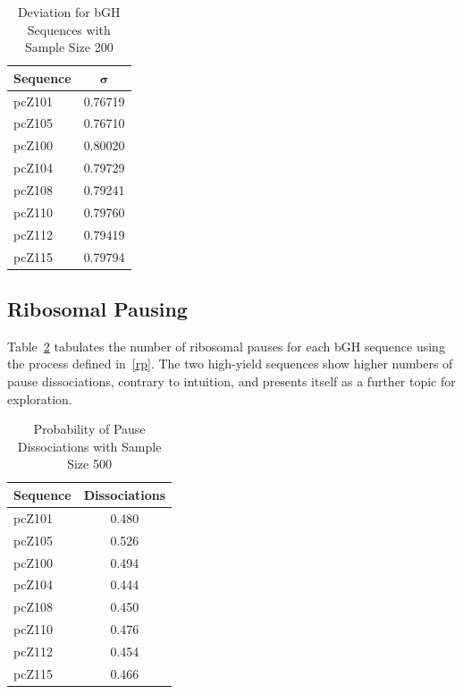 \documentclass[10pt,twocolumn,draft]{article}
\begin{document}
\begin{table}[tbp]
\begin{center}
    \begin{tabular}{lc}
        \toprule
        \textbf{Sequence} & $\mathbf{\sigma}$\\
        \midrule
        pcZ101 & 0.76719\\
        pcZ105 & 0.76710\\
        \midrule
        pcZ100 & 0.80020\\
        pcZ104 & 0.79729\\
        pcZ108 & 0.79241\\
        pcZ110 & 0.79760\\
        pcZ112 & 0.79419\\
        pcZ115 & 0.79794\\
        \bottomrule
    \end{tabular}
    \caption{Deviation for bGH Sequences with Sample Size 200}
    \label{deviation}
\end{center}
\end{table}

\subsection{Ribosomal Pausing}

Table~\ref{wichita} tabulates the number of ribosomal pauses for each bGH sequence
using the process defined in~\ref{rp}. The two high-yield sequences show higher numbers of pause
dissociations, contrary to intuition, and presents itself as a further topic for exploration.

\begin{table}[tbp]
\begin{center}
    \begin{tabular}{lc}
        \toprule
        \textbf{Sequence} & \textbf{Dissociations}\\
        \midrule
        pcZ101 & 0.480\\
        pcZ105 & 0.526\\
        \midrule
        pcZ100 & 0.494\\
        pcZ104 & 0.444\\
        pcZ108 & 0.450\\
        pcZ110 & 0.476\\
        pcZ112 & 0.454\\
        pcZ115 & 0.466\\
        \bottomrule
    \end{tabular}
    \caption{Probability of Pause Dissociations with Sample Size 500}
    \label{wichita}
\end{center}
\end{table}
\end{document}
